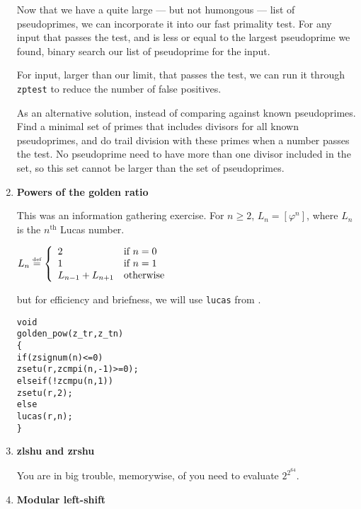 \begin{enumerate}[label=\textbf{\arabic*}.]
Now that we have a quite large — but not humongous — list
of pseudoprimes, we can incorporate it into our fast
primality test. For any input that passes the test, and
is less or equal to the largest pseudoprime we found,
binary search our list of pseudoprime for the input.

For input, larger than our limit, that passes the test,
we can run it through \texttt{zptest} to reduce the
number of false positives.

As an alternative solution, instead of comparing against
known pseudoprimes. Find a minimal set of primes that
includes divisors for all known pseudoprimes, and do
trail division with these primes when a number passes
the test. No pseudoprime need to have more than one divisor
included in the set, so this set cannot be larger than
the set of pseudoprimes.



\item \textbf{Powers of the golden ratio}

This was an information gathering exercise.
For $n \ge 2$, $L_n = [\varphi^n]$, where
$L_n$ is the $n^\text{th}$ Lucas number.

\( \displaystyle{
    L_n \stackrel{\text{\tiny{def}}}{\text{=}} \left \{ \begin{array}{ll}
      2 & \text{if} ~ n = 0 \\
      1 & \text{if} ~ n = 1 \\
      L_{n - 1} + L_{n + 1} & \text{otherwise}
    \end{array} \right .
}\)

\noindent
but for efficiency and briefness, we will use
\texttt{lucas} from .

\vspace{-1em}
\begin{alltt}
void
golden_pow(z_t r, z_t n)
\{
    if (zsignum(n) <= 0)
        zsetu(r, zcmpi(n, -1) >= 0);
    else if (!zcmpu(n, 1))
        zsetu(r, 2);
    else
        lucas(r, n);
\}
\end{alltt}
\vspace{-1em}



\item \textbf{zlshu and zrshu}

You are in big trouble, memorywise, of you
need to evaluate $2^{2^{64}}$.



\item \textbf{Modular left-shift}


\end{enumerate}
